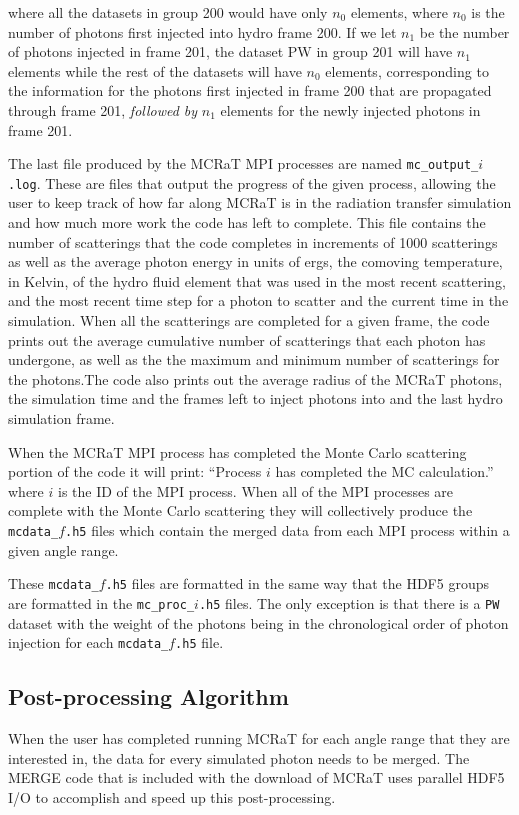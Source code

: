 \documentclass[12pt,a4paper]{article}
\begin{document}
\newpage where all the datasets in group 200 would have only $n_{0}$ elements, where $n_{0}$ is the number of photons first injected into hydro frame 200. If we let $n_{1}$ be the number of photons injected in frame 201, the dataset PW in group 201 will have $n_{1}$ elements while the rest of the datasets will have $n_{0}$ elements, corresponding to the information for the photons first injected in frame 200 that are propagated through frame 201, \textit{followed by} $n_{1}$ elements for the newly injected photons in frame 201. 

The last file produced by the MCRaT MPI processes are named \texttt{mc\_output\_$i$.log}. These are files that output the progress of the given process, allowing the user to keep track of how far along MCRaT is in the radiation transfer simulation and how much more work the code has left to complete. This file contains the number of scatterings that the code completes in increments of 1000 scatterings as well as the average photon energy in units of ergs, the comoving temperature, in Kelvin, of the hydro fluid element that was used in the most recent scattering, and the most recent time step for a photon to scatter and the current time in the simulation. When all the scatterings are completed for a given frame, the code prints out the average cumulative number of scatterings that each photon has undergone, as well as the the maximum and minimum number of scatterings for the photons.The code also prints out the average radius of the MCRaT photons, the simulation time and the frames left to inject photons into and the last hydro simulation frame.

When the MCRaT MPI process has completed the Monte Carlo scattering portion of the code it will print: ``Process $i$ has completed the MC calculation.'' where $i$ is the ID of the MPI process. When all of the MPI processes are complete with the Monte Carlo scattering they will collectively produce the \texttt{mcdata\_$f$.h5} files which contain the merged data from each MPI process within a given angle range.

These \texttt{mcdata\_$f$.h5} files are formatted in the same way that the HDF5 groups are formatted in the \texttt{mc\_proc\_$i$.h5} files. The only exception is that there is a \texttt{PW} dataset with the weight of the photons being in the chronological order of photon injection for each \texttt{mcdata\_$f$.h5} file.

\subsection{Post-processing Algorithm}
When the user has completed running MCRaT for each angle range that they are interested in, the data for every simulated photon needs to be merged. The MERGE code that is included with the download of MCRaT uses parallel HDF5 I/O to accomplish and speed up this post-processing. 
\end{document}

